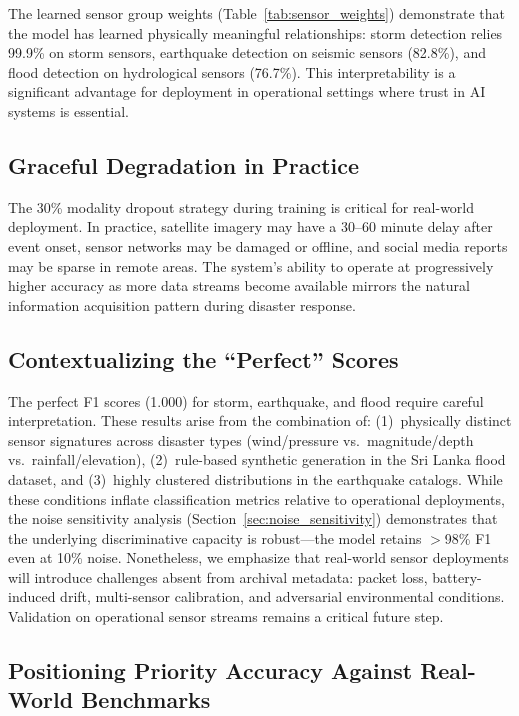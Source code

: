 \documentclass[journal]{IEEEtran}
\begin{document}
The learned sensor group weights (Table~\ref{tab:sensor_weights}) demonstrate that the model has learned physically meaningful relationships: storm detection relies 99.9\% on storm sensors, earthquake detection on seismic sensors (82.8\%), and flood detection on hydrological sensors (76.7\%). This interpretability is a significant advantage for deployment in operational settings where trust in AI systems is essential.

\subsection{Graceful Degradation in Practice}

The 30\% modality dropout strategy during training is critical for real-world deployment. In practice, satellite imagery may have a 30--60 minute delay after event onset, sensor networks may be damaged or offline, and social media reports may be sparse in remote areas. The system's ability to operate at progressively higher accuracy as more data streams become available mirrors the natural information acquisition pattern during disaster response.

\subsection{Contextualizing the ``Perfect'' Scores}

The perfect F1 scores (1.000) for storm, earthquake, and flood require careful interpretation. These results arise from the combination of: (1)~physically distinct sensor signatures across disaster types (wind/pressure vs.\ magnitude/depth vs.\ rainfall/elevation), (2)~rule-based synthetic generation in the Sri Lanka flood dataset, and (3)~highly clustered distributions in the earthquake catalogs. While these conditions inflate classification metrics relative to operational deployments, the noise sensitivity analysis (Section~\ref{sec:noise_sensitivity}) demonstrates that the underlying discriminative capacity is robust---the model retains $>$98\% F1 even at 10\% noise. Nonetheless, we emphasize that real-world sensor deployments will introduce challenges absent from archival metadata: packet loss, battery-induced drift, multi-sensor calibration, and adversarial environmental conditions. Validation on operational sensor streams remains a critical future step.

\subsection{Positioning Priority Accuracy Against Real-World Benchmarks}
\end{document}
